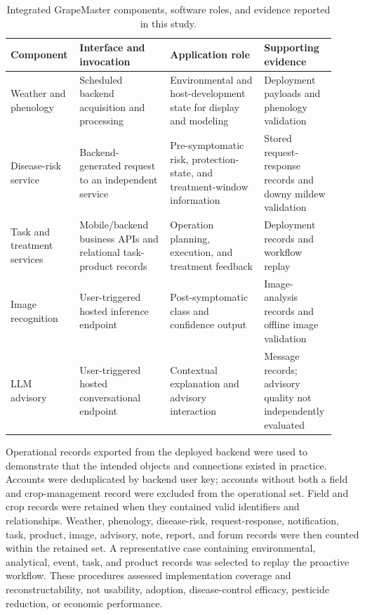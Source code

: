 \documentclass[12pt]{article}
\newcommand{\tablefontsize}{\fontsize{9pt}{11pt}\selectfont}
\begin{document}
\begin{table}[H]
\centering
\caption{Integrated GrapeMaster components, software roles, and evidence reported in this study.}
\label{tab:module_provenance}
\tablefontsize
\begin{tabular}{@{}p{0.19\linewidth} p{0.27\linewidth} p{0.28\linewidth} p{0.18\linewidth}@{}}
\toprule
Component & Interface and invocation & Application role & Supporting evidence \\
\midrule
Weather and phenology & Scheduled backend acquisition and processing & Environmental and host-development state for display and modeling & Deployment payloads and phenology validation \\
Disease-risk service & Backend-generated request to an independent service & Pre-symptomatic risk, protection-state, and treatment-window information & Stored request-response records and downy mildew validation \\
Task and treatment services & Mobile/backend business APIs and relational task-product records & Operation planning, execution, and treatment feedback & Deployment records and workflow replay \\
Image recognition & User-triggered hosted inference endpoint & Post-symptomatic class and confidence output & Image-analysis records and offline image validation \\
LLM advisory & User-triggered hosted conversational endpoint & Contextual explanation and advisory interaction & Message records; advisory quality not independently evaluated \\
\bottomrule
\end{tabular}
\end{table}

Operational records exported from the deployed backend were used to demonstrate that the intended objects and connections existed in practice. Accounts were deduplicated by backend user key; accounts without both a field and crop-management record were excluded from the operational set. Field and crop records were retained when they contained valid identifiers and relationships. Weather, phenology, disease-risk, request-response, notification, task, product, image, advisory, note, report, and forum records were then counted within the retained set. A representative case containing environmental, analytical, event, task, and product records was selected to replay the proactive workflow. These procedures assessed implementation coverage and reconstructability, not usability, adoption, disease-control efficacy, pesticide reduction, or economic performance.
\end{document}
